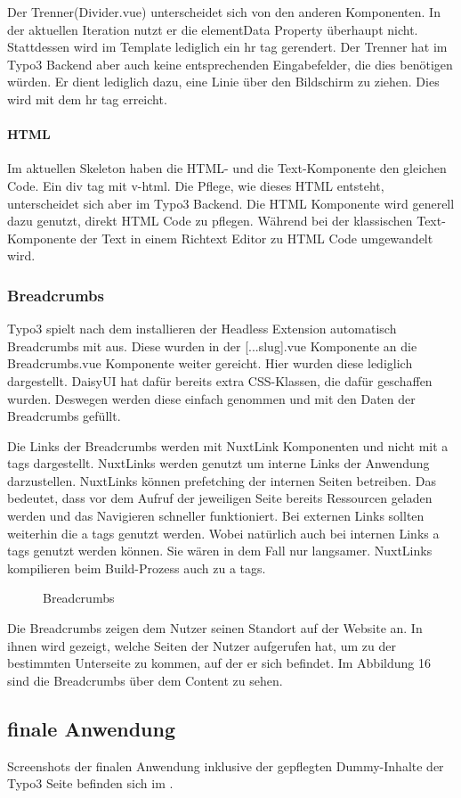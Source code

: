 Der Trenner(Divider.vue) unterscheidet sich von den anderen Komponenten. In der aktuellen Iteration nutzt er die elementData Property überhaupt nicht. Stattdessen wird im Template lediglich ein hr tag gerendert. Der Trenner hat im Typo3 Backend aber auch keine entsprechenden Eingabefelder, die dies benötigen würden. Er dient lediglich dazu, eine Linie über den Bildschirm zu ziehen. Dies wird mit dem hr tag erreicht.

\paragraph{HTML}

Im aktuellen Skeleton haben die HTML- und die Text-Komponente den gleichen Code. Ein div tag mit v-html. Die Pflege, wie dieses HTML entsteht, unterscheidet sich aber im Typo3 Backend. Die HTML Komponente wird generell dazu genutzt, direkt HTML Code zu pflegen. Während bei der klassischen Text-Komponente der Text in einem Richtext Editor zu HTML Code umgewandelt wird.

\subsubsection{Breadcrumbs}
\label{sec:Breadcrumbs}

Typo3 spielt nach dem installieren der Headless Extension automatisch Breadcrumbs mit aus. Diese wurden in der [...slug].vue Komponente an die Breadcrumbs.vue Komponente weiter gereicht. Hier wurden diese lediglich dargestellt. DaisyUI hat dafür bereits extra CSS-Klassen, die dafür geschaffen wurden. Deswegen werden diese einfach genommen und mit den Daten der Breadcrumbs gefüllt. 

Die Links der Breadcrumbs werden mit NuxtLink Komponenten und nicht mit a tags dargestellt. NuxtLinks werden genutzt um interne Links der Anwendung darzustellen. NuxtLinks können prefetching der internen Seiten betreiben. Das bedeutet, dass vor dem Aufruf der jeweiligen Seite bereits Ressourcen geladen werden und das Navigieren schneller funktioniert. Bei externen Links sollten weiterhin die a tags genutzt werden. Wobei natürlich auch bei internen Links a tags genutzt werden können. Sie wären in dem Fall nur langsamer. NuxtLinks kompilieren beim Build-Prozess auch zu a tags.

\begin{figure}[htb]
\centering
{}
\caption{Breadcrumbs}
\label{fig:Breadcrumbs}
\end{figure}

Die Breadcrumbs zeigen dem Nutzer seinen Standort auf der Website an. In ihnen wird gezeigt, welche Seiten der Nutzer aufgerufen hat, um zu der bestimmten Unterseite zu kommen, auf der er sich befindet. Im  Abbildung 16 sind die Breadcrumbs über dem Content zu sehen.

\subsection{finale Anwendung}
\label{sec:finale Anwendung}

Screenshots der finalen Anwendung inklusive der gepflegten Dummy-Inhalte der Typo3 Seite befinden sich im .
